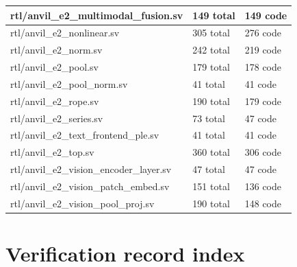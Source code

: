 \documentclass[11pt,a4paper]{article}
\begin{document}
{\begin{longtable}{@{}L{0.55\textwidth}|L{0.18\textwidth}|L{0.18\textwidth}@{}}
rtl/\allowbreak{}anvil\_\allowbreak{}e2\_\allowbreak{}multimodal\_\allowbreak{}fusion.sv & 149 total & 149 code\\[2pt]\hline

rtl/\allowbreak{}anvil\_\allowbreak{}e2\_\allowbreak{}nonlinear.sv & 305 total & 276 code\\[2pt]\hline

rtl/\allowbreak{}anvil\_\allowbreak{}e2\_\allowbreak{}norm.sv & 242 total & 219 code\\[2pt]\hline

rtl/\allowbreak{}anvil\_\allowbreak{}e2\_\allowbreak{}pool.sv & 179 total & 178 code\\[2pt]\hline

rtl/\allowbreak{}anvil\_\allowbreak{}e2\_\allowbreak{}pool\_\allowbreak{}norm.sv & 41 total & 41 code\\[2pt]\hline

rtl/\allowbreak{}anvil\_\allowbreak{}e2\_\allowbreak{}rope.sv & 190 total & 179 code\\[2pt]\hline

rtl/\allowbreak{}anvil\_\allowbreak{}e2\_\allowbreak{}series.sv & 73 total & 47 code\\[2pt]\hline

rtl/\allowbreak{}anvil\_\allowbreak{}e2\_\allowbreak{}text\_\allowbreak{}frontend\_\allowbreak{}ple.sv & 41 total & 41 code\\[2pt]\hline

rtl/\allowbreak{}anvil\_\allowbreak{}e2\_\allowbreak{}top.sv & 360 total & 306 code\\[2pt]\hline

rtl/\allowbreak{}anvil\_\allowbreak{}e2\_\allowbreak{}vision\_\allowbreak{}encoder\_\allowbreak{}layer.sv & 47 total & 47 code\\[2pt]\hline

rtl/\allowbreak{}anvil\_\allowbreak{}e2\_\allowbreak{}vision\_\allowbreak{}patch\_\allowbreak{}embed.sv & 151 total & 136 code\\[2pt]\hline

rtl/\allowbreak{}anvil\_\allowbreak{}e2\_\allowbreak{}vision\_\allowbreak{}pool\_\allowbreak{}proj.sv & 190 total & 148 code\\[2pt]\hline

\bottomrule\end{longtable}}

\section{Verification record index}
\end{document}
